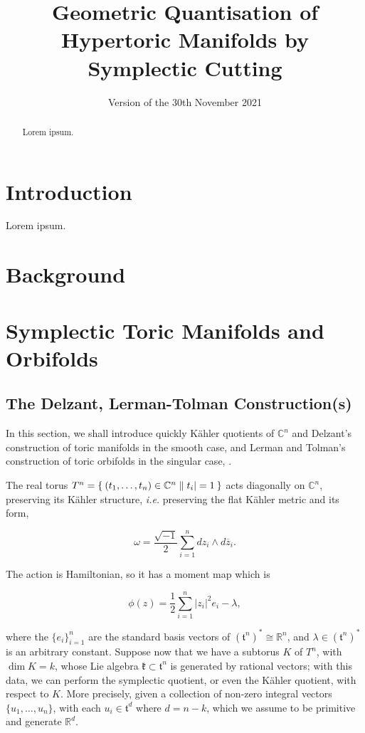 \documentclass{amsart}
\title{Geometric Quantisation of Hypertoric Manifolds by Symplectic Cutting}
\date{Version of the 30th November 2021}	%
\newcommand{\ie}{\emph{i.e.} }
\newcommand{\w}{\omega}
\newcommand{\RR}{\mathbb{R}}
\newcommand{\CC}{\mathbb{C}}
\newcommand{\mfk}{\mathfrak{k}}
\newcommand{\mft}{\mathfrak{t}}
\newcommand{\zbar}{\overline{z}}
\begin{document}
	\maketitle
	
	\begin{abstract}
		Lorem ipsum.
	\end{abstract}
	
	\section{Introduction}
	
	Lorem ipsum.
	
	\section{Background}
    
    \section{Symplectic Toric Manifolds and Orbifolds}
    
    \subsection{The Delzant, Lerman-Tolman Construction(s)}
	
    In this section, we shall introduce quickly K\"ahler quotients of $\CC^{n}$ and Delzant's construction of toric manifolds in the smooth case, and Lerman and Tolman's construction of toric orbifolds in the singular case, \cite{Del88, Lerman1997}.
    
    The real torus $T^{n} = \Set{(t_{1}, \ldots, t_{n}) \in \CC^{n} | |t_{i}| = 1 }$ acts diagonally on $\CC^{n}$, preserving its K\"ahler structure, \ie preserving the flat K\"ahler metric and its form,

    \begin{equation}\label{eqn:flat-kahler-form}
        \w = \frac{\sqrt{-1}}{2}\sum_{i=1}^{n} dz_{i} \wedge d\zbar_{i}.
    \end{equation}
    
    The action is Hamiltonian, so it has a moment map which is
    
    \begin{equation}\label{eqn:flat-kahler-moment}
        \phi(z) = \frac{1}{2}\sum_{i=1}^{n}|z_{i}|^{2}e_{i} - \lambda,
    \end{equation}
    
    where the $\{e_{i}\}_{i=1}^{n}$ are the standard basis vectors of $(\mft^{n})^{\ast} \cong \RR^{n}$, and $\lambda \in (\mft^{n})^{\ast}$ is an arbitrary constant. Suppose now that we have a subtorus $K$ of $T^{n}$, with $\dim K = k$, whose Lie algebra $\mfk \subset \mft^{n}$ is generated by rational vectors; with this data, we can perform the symplectic quotient, or even the K\"ahler quotient, with respect to $K$. More precisely, given a collection of non-zero integral vectors $\{u_{1}, \ldots, u_{n}\}$, with each $u_{i} \in \mft^{d}$ where $d= n - k$, which we assume to be primitive and generate $\RR^{d}$.
    
\end{document}

